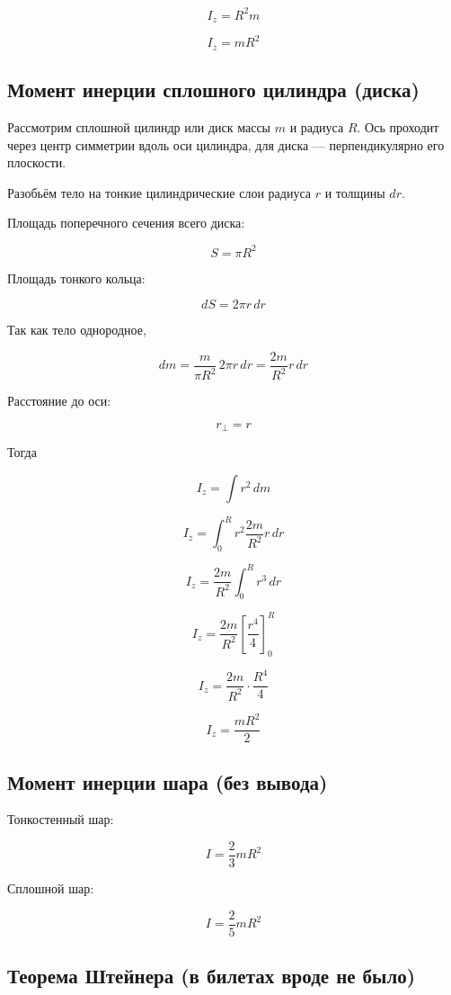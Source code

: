 \documentclass[a4paper,12pt]{article}
\begin{document}
\[
I_z = R^2 m
\]

\[
I_z = mR^2
\]

\vspace{0.8em}

\subsection*{Момент инерции сплошного цилиндра (диска)}

Рассмотрим сплошной цилиндр или диск массы $m$ и радиуса $R$.
Ось проходит через центр симметрии вдоль оси цилиндра, для диска — перпендикулярно его плоскости.

Разобьём тело на тонкие цилиндрические слои радиуса $r$ и толщины $dr$.

Площадь поперечного сечения всего диска:

\[
S = \pi R^2
\]

Площадь тонкого кольца:

\[
dS = 2\pi r \, dr
\]

Так как тело однородное,

\[
dm = \frac{m}{\pi R^2} \, 2\pi r \, dr = \frac{2m}{R^2} r \, dr
\]

Расстояние до оси:

\[
r_{\perp} = r
\]

Тогда

\[
I_z = \int r^2 \, dm
\]

\[
I_z = \int_0^R r^2 \frac{2m}{R^2} r \, dr
\]

\[
I_z = \frac{2m}{R^2} \int_0^R r^3 \, dr
\]

\[
I_z = \frac{2m}{R^2} \left[ \frac{r^4}{4} \right]_0^R
\]

\[
I_z = \frac{2m}{R^2} \cdot \frac{R^4}{4}
\]

\[
I_z = \frac{mR^2}{2}
\]

\vspace{0.8em}

\subsection*{Момент инерции шара (без вывода)}

Тонкостенный шар:

\[
I = \frac{2}{3} mR^2
\]

Сплошной шар:

\[
I = \frac{2}{5} mR^2
\] 

\vspace{0.8em}

\subsection*{Теорема Штейнера (в билетах вроде не было)}
\end{document}
